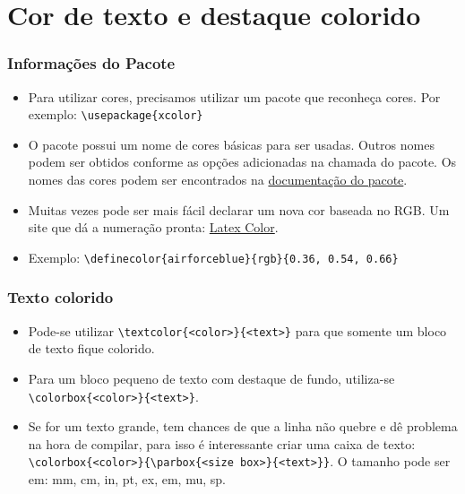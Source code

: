 \documentclass[brazilian]{beamer}
\begin{document}
\section{Cor de texto e destaque colorido}
\begin{frame}[fragile]
    \frametitle{Informações do Pacote}

    \begin{itemize}
        \item Para utilizar cores, precisamos utilizar um pacote que reconheça cores. Por exemplo: \lstinline[style=myStyleLatex]!\usepackage{xcolor}!
        \item O pacote possui um nome de cores básicas para ser usadas. Outros nomes podem ser obtidos conforme as opções adicionadas na chamada do pacote. Os nomes das cores podem ser encontrados na \href{https://ctan.dcc.uchile.cl/macros/latex/contrib/xcolor/xcolor.pdf}{documentação do pacote}.
        \item Muitas vezes pode ser mais fácil declarar um nova cor baseada no RGB. Um site que dá a numeração pronta: \href{http://latexcolor.com/}{Latex Color}.
        \item Exemplo: \lstinline[style=myStyleLatex]!\definecolor{airforceblue}{rgb}{0.36, 0.54, 0.66}!
    \end{itemize}

\end{frame}

\begin{frame}[fragile]
    \frametitle{Texto colorido}

    \begin{itemize}
        \item Pode-se utilizar \lstinline[style=myStyleLatex]!\textcolor{<color>}{<text>}! para que somente um bloco de texto fique colorido.
        \item Para um bloco pequeno de texto com destaque de fundo, utiliza-se \lstinline[style=myStyleLatex]!\colorbox{<color>}{<text>}!.
        \item Se for um texto grande, tem chances de que a linha não quebre e dê problema na hora de compilar, para isso é interessante criar uma caixa de texto: \lstinline[style=myStyleLatex]!\colorbox{<color>}{\parbox{<size box>}{<text>}}!. O tamanho pode ser em: mm, cm, in, pt, ex, em, mu, sp.
    \end{itemize}

\end{frame}
\end{document}
